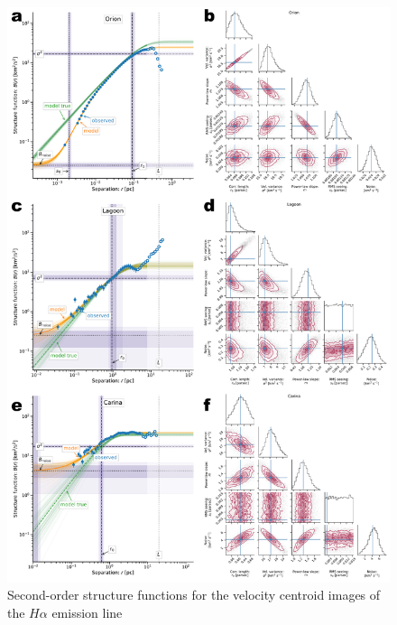\documentclass[fleqn,usenatbib, useAMS, a4paper]{mnras}
\begin{document}
\begin{figure}
  \centering
  \includegraphics[width=0.8\linewidth]{Figures/strucfunc-fit-A}
  \caption{Second-order structure functions for the velocity centroid images of the \(H\alpha\) emission line}\label{fig:strucfunc-fit-A}
\end{figure}
\end{document}
